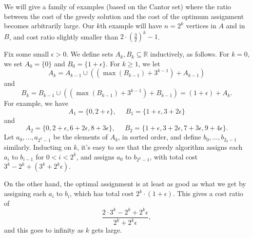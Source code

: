 \documentclass[12pt]{article}
\begin{document}
\begin{enumerate}
We will give a family of examples (based on the Cantor set) where the ratio between the cost of the greedy solution and the cost of the optimum assignment becomes arbitrarily large. Our $k$th example will have $n = 2^k$ vertices in $A$ and in $B$, and cost ratio slightly smaller than $2\cdot (\frac{3}{2})^k - 1$.

Fix some small $\epsilon > 0$. We define sets $A_k, B_k \subseteq \mathbb{R}$ inductively, as follows. For $k = 0$, we set $A_0 = \{0\}$ and $B_0 = \{1+\epsilon\}$. For $k \ge 1$, we let
\[
A_k = A_{k-1} \cup ((\max(B_{k-1}) + 3^{k-1}) + A_{k-1})
\]
and
\[
B_k = B_{k-1} \cup ((\max(B_{k-1}) + 3^{k-1}) + B_{k-1}) = (1+\epsilon) + A_k.
\]
For example, we have
\[
A_1 = \{0, 2+\epsilon\}, \;\;\;\;\; B_1 = \{1+\epsilon, 3+2\epsilon\}
\]
and
\[
A_2 = \{0, 2+\epsilon, 6+2\epsilon, 8+3\epsilon\}, \;\;\;\;\; B_2 = \{1+\epsilon, 3+2\epsilon, 7+3\epsilon, 9+4\epsilon\}.
\]
Let $a_0, ..., a_{2^k-1}$ be the elements of $A_k$, in sorted order, and define $b_0, ..., b_{2_k-1}$ similarly. Inducting on $k$, it's easy to see that the greedy algorithm assigns each $a_i$ to $b_{i-1}$ for $0 < i < 2^k$, and assigns $a_0$ to $b_{2^k-1}$, with total cost $3^k - 2^k + (3^k + 2^k\epsilon)$.

On the other hand, the optimal assignment is at least as good as what we get by assigning each $a_i$ to $b_i$, which has total cost $2^k\cdot(1+\epsilon)$. This gives a cost ratio of
\[
\frac{2\cdot 3^k - 2^k + 2^k\epsilon}{2^k + 2^k\epsilon},
\]
and this goes to infinity as $k$ gets large.


\end{enumerate}
\end{document}
